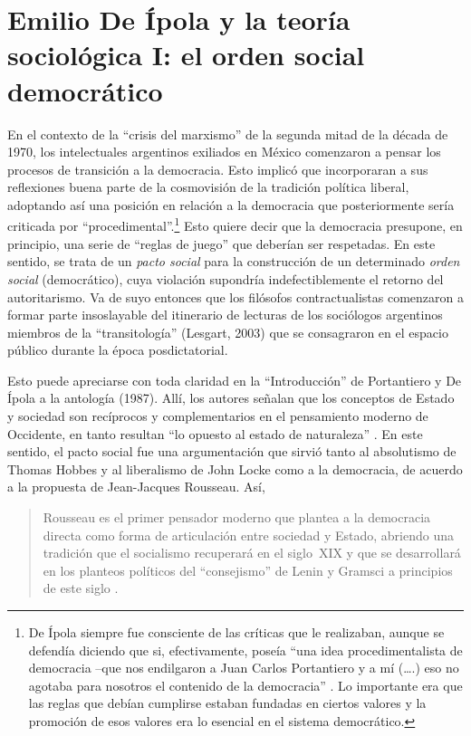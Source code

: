 \section{Emilio De Ípola y la teoría sociológica I: el orden social democrático}

En el contexto de la \enquote{crisis del marxismo} de la segunda mitad de la década de 1970, los intelectuales argentinos exiliados en México comenzaron a pensar los procesos de transición a la democracia. Esto implicó que incorporaran a sus reflexiones buena parte de la cosmovisión de la tradición política liberal, adoptando así una posición en relación a la democracia que posteriormente sería criticada por \enquote{procedimental}.\footnote{De Ípola siempre fue consciente de las críticas que le realizaban, aunque se defendía diciendo que si, efectivamente, poseía \enquote{una idea procedimentalista de democracia --que nos endilgaron a Juan Carlos Portantiero y a mí (\ldots.) eso no agotaba para nosotros el contenido de la democracia} \parencite[101]{1525-RINESI2004}. Lo importante era que las reglas que debían cumplirse estaban fundadas en ciertos valores y la promoción de esos valores era lo esencial en el sistema democrático.} Esto quiere decir que la democracia presupone, en principio, una serie de \enquote{reglas de juego} que deberían ser respetadas. En este sentido, se trata de un \emph{pacto social} para la construcción de un determinado \emph{orden social} (democrático), cuya violación supondría indefectiblemente el retorno del autoritarismo. Va de suyo entonces que los filósofos contractualistas comenzaron a formar parte insoslayable del itinerario de lecturas de los sociólogos argentinos miembros de la \enquote{transitología} (Lesgart, 2003) que se consagraron en el espacio público durante la época posdictatorial.

Esto puede apreciarse con toda claridad en la \enquote{Introducción} de Portantiero y De Ípola a la antología  (1987). Allí, los autores señalan que los conceptos de Estado y sociedad son recíprocos y complementarios en el pensamiento moderno de Occidente, en tanto resultan \enquote{lo opuesto al estado de naturaleza} \parencite[7]{1540-PORTANTIERO1987}. En este sentido, el pacto social fue una argumentación que sirvió tanto al absolutismo de Thomas Hobbes y al liberalismo de John Locke como a la democracia, de acuerdo a la propuesta de Jean-Jacques Rousseau. Así,

\begin{quote}
Rousseau es el primer pensador moderno que plantea a la democracia directa como forma de articulación entre sociedad y Estado, abriendo una tradición que el socialismo recuperará en el siglo~XIX y que se desarrollará en los planteos políticos del \enquote{consejismo} de Lenin y Gramsci a principios de este siglo \parencite[10]{1540-PORTANTIERO1987}.
\end{quote}

